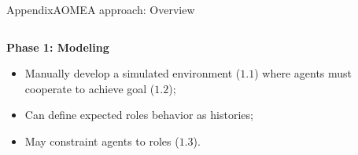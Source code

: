 \begin{frame}{Appendix}{AOMEA approach: Overview}

    \begin{columns}

        \begin{column}{0.6\textwidth}

            \textbf{Phase 1: Modeling}

            \begin{itemize}
                \item Manually develop a simulated environment ($1.1$) where agents must cooperate to achieve goal ($1.2$);
                \item Can define expected roles behavior as histories;
                \item May constraint agents to roles ($1.3$).
            \end{itemize}

        \end{column}

        \begin{column}{0.4\textwidth}
            \centering
        \end{column}


\end{columns}
\end{frame}
